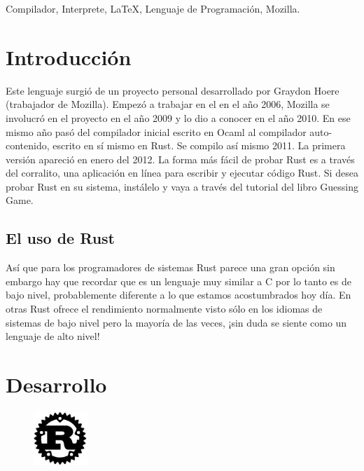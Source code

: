 \documentclass[journal]{IEEEtran}
\begin{document}

\begin{IEEEkeywords}
Compilador, Interprete, \LaTeX, Lenguaje de Programación, Mozilla.
\end{IEEEkeywords}



\IEEEpeerreviewmaketitle

\section{Introducción}
Este lenguaje surgió de un proyecto personal desarrollado por Graydon Hoere (trabajador de Mozilla). Empezó a trabajar en el en el año 2006, Mozilla se involucró en el proyecto en el año 2009 y lo dio a conocer en el año 2010. En ese mismo año pasó del compilador inicial escrito en Ocaml al compilador auto-contenido, escrito en sí mismo en Rust. Se compilo así mismo 2011. La primera versión apareció en enero del 2012. La forma más fácil de probar Rust es a través del corralito, una aplicación en línea para escribir y ejecutar código Rust. Si desea probar Rust en su sistema, instálelo y vaya a través del tutorial del libro Guessing Game.

\subsection{El uso de Rust}
Así que para los programadores de sistemas Rust parece una gran opción sin embargo hay que recordar que es un lenguaje muy similar a C por lo tanto es de bajo nivel, probablemente diferente a lo que estamos acostumbrados hoy día. En otras Rust ofrece el rendimiento normalmente visto sólo en los idiomas de sistemas de bajo nivel pero la mayoría de las veces, ¡sin duda se siente como un lenguaje de alto nivel!



\section{Desarrollo}


\begin{figure} %
    \centering    
    \includegraphics[width=0.8in,height=0.8in\columnwidth]{rust}
\end{figure}
\end{document}
